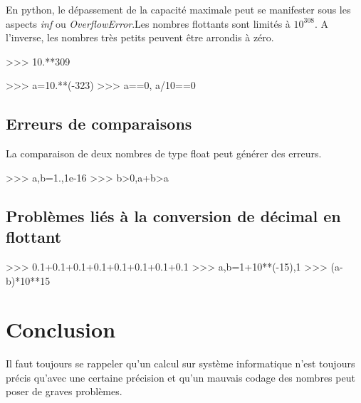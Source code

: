 \documentclass[10pt,fleqn]{article} %
\begin{document}
En python, le dépassement de la capacité maximale peut se manifester sous les aspects \textsl{inf} ou \textsl{OverflowError}.Les nombres flottants sont limités à $10^{308}$. A l'inverse, les nombres très petits peuvent être arrondis à zéro.


\begin{minipage}[c]{.45\linewidth}
\begin{py}
\begin{python}
>>> 10.**309
\end{python}
\end{py}
\end{minipage}\hfill
\begin{minipage}[c]{.45\linewidth}
\begin{py}
\begin{python}
>>> a=10.**(-323)
>>> a==0, a/10==0
\end{python}
\end{py}
\end{minipage}

\subsection{Erreurs de comparaisons}
La comparaison de deux nombres de type float peut générer des erreurs.
\begin{py}
\begin{python}
>>> a,b=1.,1e-16
>>> b>0,a+b>a
\end{python}
\end{py}

\subsection{Problèmes liés à la conversion de décimal en flottant}
\begin{py}
\begin{python}
>>> 0.1+0.1+0.1+0.1+0.1+0.1+0.1+0.1
>>> a,b=1+10**(-15),1
>>> (a-b)*10**15
\end{python}
\end{py}



\section{Conclusion}

Il faut toujours se rappeler qu’un calcul sur système informatique n’est toujours précis qu’avec une certaine précision et qu’un mauvais codage des nombres peut poser de graves problèmes.
\end{document}
